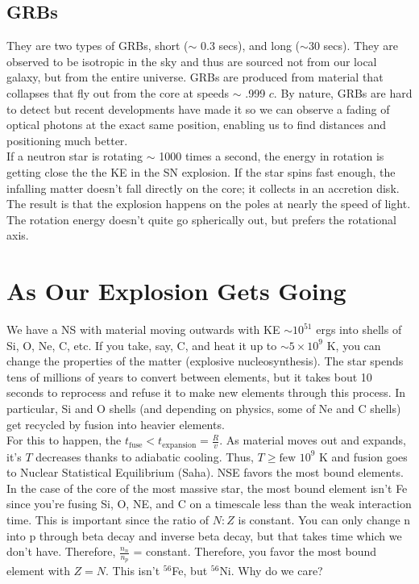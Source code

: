  \subsection{GRBs}

They are two types of GRBs, short ($\sim$ 0.3 secs), and long ($\sim 30$ secs). They are observed to be isotropic in the sky and thus are sourced not from our local galaxy, but from the entire universe. GRBs are produced from material that collapses that fly out from the core at speeds $\sim$ .999 $c$. By nature, GRBs are hard to detect but recent developments have made it so we can observe a fading of optical photons at the exact same position, enabling us to find distances and positioning much better. \\

If a neutron star is rotating $\sim$ 1000 times a second, the energy in rotation is getting close the the KE in the SN explosion. If the star spins fast enough, the infalling matter doesn't fall directly on the core; it collects in an accretion disk. The result is that the explosion happens on the poles at nearly the speed of light. The rotation energy doesn't quite go spherically out, but prefers the rotational axis. 

\section{As Our Explosion Gets Going}

We have a NS with material moving outwards with KE $\sim 10^{51}$ ergs into shells of Si, O, Ne, C, etc. If you take, say, C, and heat it up to $\sim 5 \times 10^9$ K, you can change the properties of the matter (explosive nucleosynthesis). The star spends tens of millions of years to convert between elements, but it takes bout 10 seconds to reprocess and refuse it to make new elements through this process. In particular, Si and O shells (and depending on physics, some of Ne and C shells) get recycled by fusion into heavier elements.\\

For this to happen, the $t_{\textrm{fuse}} < t_{\textrm{expansion}} = \frac{R}{v}$. As material moves out and expands, it's $T$ decreases thanks to adiabatic cooling. Thus, $T \geq \textrm{few } 10^9$ K and fusion goes to Nuclear Statistical Equilibrium (Saha). NSE favors the most bound elements. In the case of the core of the most massive star, the most bound element isn't Fe since you're fusing Si, O, NE, and C on a timescale less than the weak interaction time. This is important since the ratio of $N:Z$ is constant. You can only change n into p through beta decay and inverse beta decay, but that takes time which we don't have. Therefore, $\frac{n_n}{n_p}$ = constant. Therefore, you favor the most bound element with $Z = N$. This isn't $^{56}$Fe, but $^{56}$Ni. Why do we care?\\

